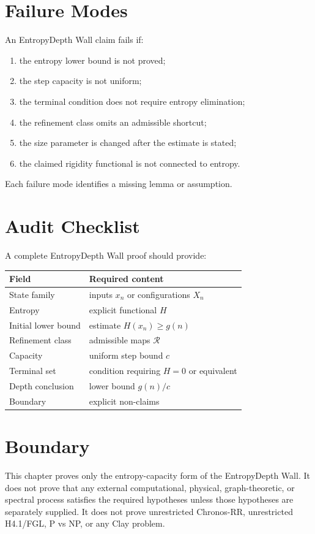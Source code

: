 \section{Failure Modes}

An EntropyDepth Wall claim fails if:

\begin{enumerate}
\item the entropy lower bound is not proved;
\item the step capacity is not uniform;
\item the terminal condition does not require entropy elimination;
\item the refinement class omits an admissible shortcut;
\item the size parameter is changed after the estimate is stated;
\item the claimed rigidity functional is not connected to entropy.
\end{enumerate}

Each failure mode identifies a missing lemma or assumption.

\section{Audit Checklist}

A complete EntropyDepth Wall proof should provide:

\begin{center}
\begin{tabular}{ll}
\toprule
Field & Required content \\
\midrule
State family & inputs \(x_n\) or configurations \(X_n\) \\
Entropy & explicit functional \(H\) \\
Initial lower bound & estimate \(H(x_n)\ge g(n)\) \\
Refinement class & admissible maps \(\mathcal R\) \\
Capacity & uniform step bound \(c\) \\
Terminal set & condition requiring \(H=0\) or equivalent \\
Depth conclusion & lower bound \(g(n)/c\) \\
Boundary & explicit non-claims \\
\bottomrule
\end{tabular}
\end{center}

\section{Boundary}

This chapter proves only the entropy-capacity form of the EntropyDepth Wall.
It does not prove that any external computational, physical, graph-theoretic,
or spectral process satisfies the required hypotheses unless those hypotheses
are separately supplied. It does not prove unrestricted Chronos-RR,
unrestricted H4.1/FGL, P vs NP, or any Clay problem.
